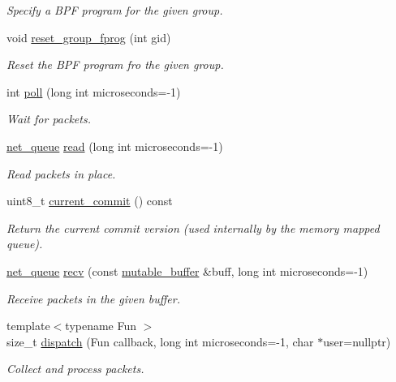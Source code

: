 \begin{DoxyCompactItemize}
\begin{DoxyCompactList}\small\item\em Specify a B\+P\+F program for the given group. \end{DoxyCompactList}\item 
void \hyperlink{classpfq_1_1socket_a2327e71a6f94e54efb0da5ec36b1c620}{reset\+\_\+group\+\_\+fprog} (int gid)
\begin{DoxyCompactList}\small\item\em Reset the B\+P\+F program fro the given group. \end{DoxyCompactList}\item 
int \hyperlink{classpfq_1_1socket_ad8ce551ea07f39317bb383ab88d66344}{poll} (long int microseconds=-\/1)
\begin{DoxyCompactList}\small\item\em Wait for packets. \end{DoxyCompactList}\item 
\hyperlink{classpfq_1_1net__queue}{net\+\_\+queue} \hyperlink{classpfq_1_1socket_a6004249d3abfe8a2329b44ba797d1909}{read} (long int microseconds=-\/1)
\begin{DoxyCompactList}\small\item\em Read packets in place. \end{DoxyCompactList}\item 
uint8\+\_\+t \hyperlink{classpfq_1_1socket_aba44de6422e3e10b65474e7f3999ebd0}{current\+\_\+commit} () const 
\begin{DoxyCompactList}\small\item\em Return the current commit version (used internally by the memory mapped queue). \end{DoxyCompactList}\item 
\hyperlink{classpfq_1_1net__queue}{net\+\_\+queue} \hyperlink{classpfq_1_1socket_a57643b9011269682bf716254c2b72907}{recv} (const \hyperlink{namespacepfq_ad7b88920eaf729154354741132483ea8}{mutable\+\_\+buffer} \&buff, long int microseconds=-\/1)
\begin{DoxyCompactList}\small\item\em Receive packets in the given buffer. \end{DoxyCompactList}\item 
{\footnotesize template$<$typename Fun $>$ }\\size\+\_\+t \hyperlink{classpfq_1_1socket_ae6cd08be2e7c35a548a64fded4359612}{dispatch} (Fun callback, long int microseconds=-\/1, char $\ast$user=nullptr)
\begin{DoxyCompactList}\small\item\em Collect and process packets. \end{DoxyCompactList}\item 

\end{DoxyCompactItemize}
